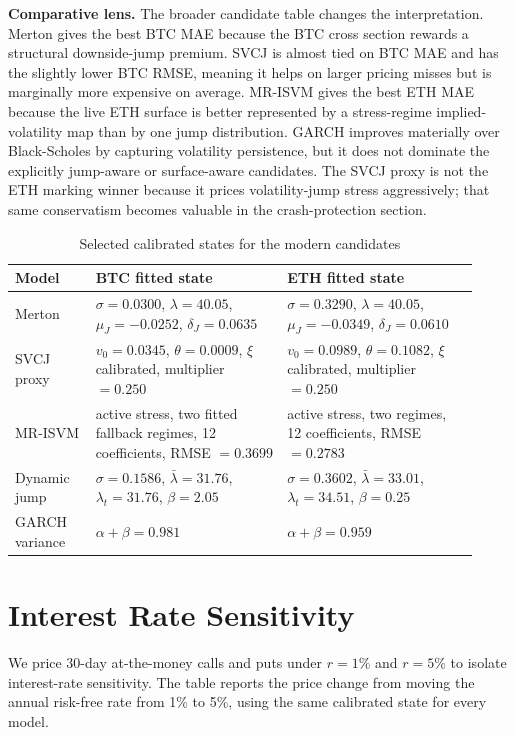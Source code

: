 \documentclass[11pt]{article}
\begin{document}
\textbf{Comparative lens.} The broader candidate table changes the interpretation. Merton gives the best BTC MAE because the BTC cross section rewards a structural downside-jump premium. SVCJ is almost tied on BTC MAE and has the slightly lower BTC RMSE, meaning it helps on larger pricing misses but is marginally more expensive on average. MR-ISVM gives the best ETH MAE because the live ETH surface is better represented by a stress-regime implied-volatility map than by one jump distribution. GARCH improves materially over Black-Scholes by capturing volatility persistence, but it does not dominate the explicitly jump-aware or surface-aware candidates. The SVCJ proxy is not the ETH marking winner because it prices volatility-jump stress aggressively; that same conservatism becomes valuable in the crash-protection section.

\begin{table}[H]
\centering
\caption{Selected calibrated states for the modern candidates}
\scriptsize
\begin{tabular}{p{0.16\linewidth}p{0.38\linewidth}p{0.38\linewidth}}
\toprule
Model & BTC fitted state & ETH fitted state\\
\midrule
Merton & $\sigma=0.0300$, $\lambda=40.05$, $\mu_J=-0.0252$, $\delta_J=0.0635$ & $\sigma=0.3290$, $\lambda=40.05$, $\mu_J=-0.0349$, $\delta_J=0.0610$\\
SVCJ proxy & $v_0=0.0345$, $\theta=0.0009$, $\xi$ calibrated, multiplier $=0.250$ & $v_0=0.0989$, $\theta=0.1082$, $\xi$ calibrated, multiplier $=0.250$\\
MR-ISVM & active stress, two fitted fallback regimes, 12 coefficients, RMSE $=0.3699$ & active stress, two regimes, 12 coefficients, RMSE $=0.2783$\\
Dynamic jump & $\sigma=0.1586$, $\bar{\lambda}=31.76$, $\lambda_t=31.76$, $\beta=2.05$ & $\sigma=0.3602$, $\bar{\lambda}=33.01$, $\lambda_t=34.51$, $\beta=0.25$\\
GARCH variance & $\alpha+\beta=0.981$ & $\alpha+\beta=0.959$\\
\bottomrule
\end{tabular}
\end{table}

\section{Interest Rate Sensitivity}

We price 30-day at-the-money calls and puts under $r=1\%$ and $r=5\%$ to isolate interest-rate sensitivity. The table reports the price change from moving the annual risk-free rate from 1\% to 5\%, using the same calibrated state for every model.
\end{document}

